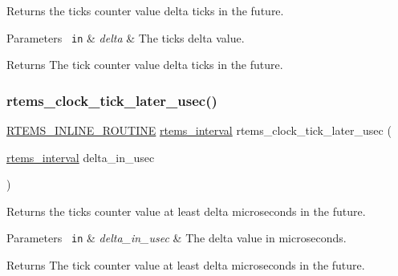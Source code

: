 Returns the ticks counter value delta ticks in the future. 


\begin{DoxyParams}[1]{Parameters}
\mbox{\texttt{ in}}  & {\em delta} & The ticks delta value.\\
\hline
\end{DoxyParams}
\begin{DoxyReturn}{Returns}
The tick counter value delta ticks in the future. 
\end{DoxyReturn}
\mbox{\label{group__ClassicClock_ga711beef8147fe462897021e9afe6fade}} 
\subsubsection{\texorpdfstring{rtems\_clock\_tick\_later\_usec()}{rtems\_clock\_tick\_later\_usec()}}
{\footnotesize\ttfamily \mbox{\hyperlink{group__RTEMSScoreBaseDefs_gac216239df231d5dbd15e3520b0b9313f}{R\+T\+E\+M\+S\+\_\+\+I\+N\+L\+I\+N\+E\+\_\+\+R\+O\+U\+T\+I\+NE}} \mbox{\hyperlink{group__ClassicTasks_gad39c43f949683d46874e3a5586b93aee}{rtems\+\_\+interval}} rtems\+\_\+clock\+\_\+tick\+\_\+later\+\_\+usec (\begin{DoxyParamCaption}\item[{\mbox{\hyperlink{group__ClassicTasks_gad39c43f949683d46874e3a5586b93aee}{rtems\+\_\+interval}}}]{delta\+\_\+in\+\_\+usec }\end{DoxyParamCaption})}



Returns the ticks counter value at least delta microseconds in the future. 


\begin{DoxyParams}[1]{Parameters}
\mbox{\texttt{ in}}  & {\em delta\+\_\+in\+\_\+usec} & The delta value in microseconds.\\
\hline
\end{DoxyParams}
\begin{DoxyReturn}{Returns}
The tick counter value at least delta microseconds in the future. 
\end{DoxyReturn}
